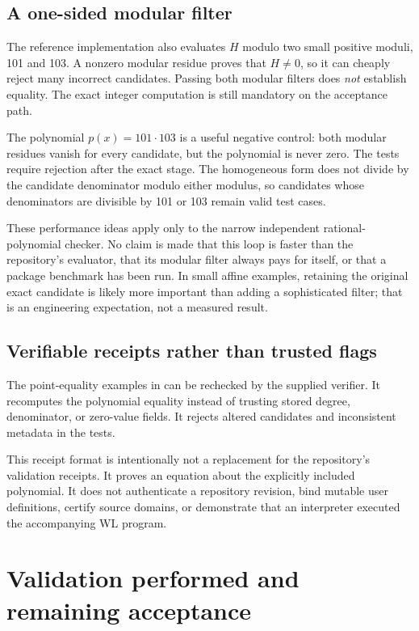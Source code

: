 \documentclass[11pt,letterpaper]{article}
\begin{document}
\subsection{A one-sided modular filter}

The reference implementation also evaluates $H$ modulo two small positive moduli, 101 and 103. A nonzero modular residue proves that $H\ne0$, so it can cheaply reject many incorrect candidates. Passing both modular filters does \emph{not} establish equality. The exact integer computation is still mandatory on the acceptance path.

The polynomial $p(x)=101\cdot103$ is a useful negative control: both modular residues vanish for every candidate, but the polynomial is never zero. The tests require rejection after the exact stage. The homogeneous form does not divide by the candidate denominator modulo either modulus, so candidates whose denominators are divisible by 101 or 103 remain valid test cases.

These performance ideas apply only to the narrow independent rational-polynomial checker. No claim is made that this loop is faster than the repository's evaluator, that its modular filter always pays for itself, or that a package benchmark has been run. In small affine examples, retaining the original exact candidate is likely more important than adding a sophisticated filter; that is an engineering expectation, not a measured result.

\subsection{Verifiable receipts rather than trusted flags}

The point-equality examples in  can be rechecked by the supplied verifier. It recomputes the polynomial equality instead of trusting stored degree, denominator, or zero-value fields. It rejects altered candidates and inconsistent metadata in the tests.

This receipt format is intentionally not a replacement for the repository's validation receipts. It proves an equation about the explicitly included polynomial. It does not authenticate a repository revision, bind mutable user definitions, certify source domains, or demonstrate that an interpreter executed the accompanying WL program.

\section{Validation performed and remaining acceptance}
\end{document}
